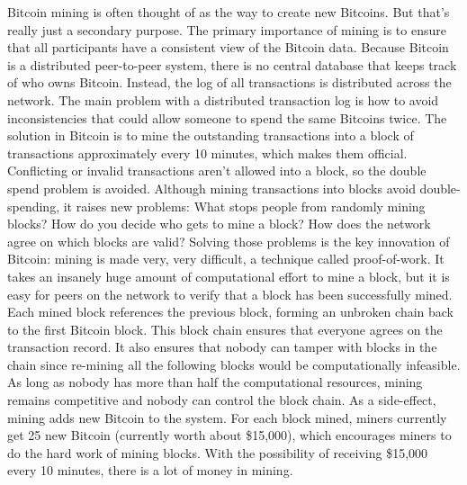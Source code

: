Bitcoin mining is often thought of as the way to create new Bitcoins. But that's really just a secondary purpose. The primary importance of mining is to ensure that all participants have a consistent view of the Bitcoin data. Because Bitcoin is a distributed peer-to-peer system, there is no central database that keeps track of who owns Bitcoin. Instead, the log of all transactions is distributed across the network.
The main problem with a distributed transaction log is how to avoid inconsistencies that could allow someone to spend the same Bitcoins twice. The solution in Bitcoin is to mine the outstanding transactions into a block of transactions approximately every 10 minutes, which makes them official. Conflicting or invalid transactions aren't allowed into a block, so the double spend problem is avoided.
Although mining transactions into blocks avoid double-spending, it raises new problems: What stops people from randomly mining blocks? How do you decide who gets to mine a block? How does the network agree on which blocks are valid? Solving those problems is the key innovation of Bitcoin: mining is made very, very difficult, a technique called proof-of-work. It takes an insanely huge amount of computational effort to mine a block, but it is easy for peers on the network to verify that a block has been successfully mined. 
Each mined block references the previous block, forming an unbroken chain back to the first Bitcoin block. This block chain ensures that everyone agrees on the transaction record. It also ensures that nobody can tamper with blocks in the chain since re-mining all the following blocks would be computationally infeasible. As long as nobody has more than half the computational resources, mining remains competitive and nobody can control the block chain.
As a side-effect, mining adds new Bitcoin to the system. For each block mined, miners currently get 25 new Bitcoin (currently worth about \$15,000), which encourages miners to do the hard work of mining blocks. With the possibility of receiving \$15,000 every 10 minutes, there is a lot of money in mining.

